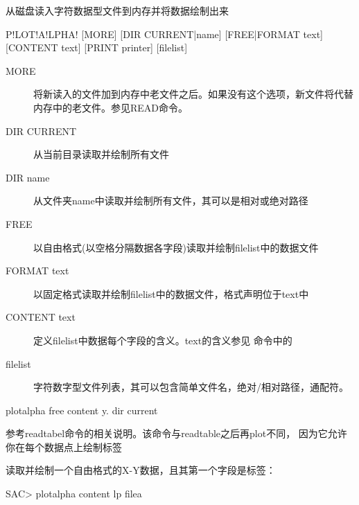 \label{cmd:plotalpha}

从磁盘读入字符数据型文件到内存并将数据绘制出来

\begin{SACSTX}
P!LOT!A!LPHA! [MORE] [DIR CURRENT|name] [FREE|FORMAT text] [CONTENT text]
    [PRINT printer] [filelist]
\end{SACSTX}

\begin{description}
\item [MORE] 将新读入的文件加到内存中老文件之后。如果没有这个选项，新文件将代替内存中的老文件。参见READ命令。
\item [DIR CURRENT] 从当前目录读取并绘制所有文件
\item [DIR name] 从文件夹name中读取并绘制所有文件，其可以是相对或绝对路径
\item [FREE] 以自由格式(以空格分隔数据各字段)读取并绘制filelist中的数据文件
\item [FORMAT text] 以固定格式读取并绘制filelist中的数据文件，格式声明位于text中
\item [CONTENT text] 定义filelist中数据每个字段的含义。text的含义参见  命令中的
\item [filelist] 字符数字型文件列表，其可以包含简单文件名，绝对/相对路径，通配符。
\end{description}

\begin{SACDFT}
plotalpha free content y. dir current
\end{SACDFT}

参考readtabel命令的相关说明。该命令与readtable之后再plot不同，
因为它允许你在每个数据点上绘制标签

读取并绘制一个自由格式的X-Y数据，且其第一个字段是标签：
\begin{SACCode}
SAC> plotalpha content lp filea
\end{SACCode}
